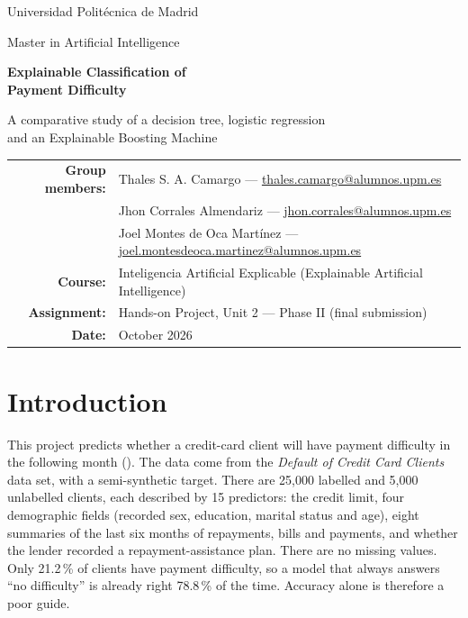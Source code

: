 \documentclass[a4paper,11pt]{article}
\newcommand{\var}[1]{\texttt{\detokenize{#1}}}
\begin{document}
\begin{titlepage}
\centering
\vspace*{1.5cm}
{\Large Universidad Politécnica de Madrid\par}
\vspace{0.4cm}
{\large Master in Artificial Intelligence\par}
\vspace{2cm}
{\huge\bfseries Explainable Classification of\\[0.2em] Payment Difficulty\par}
\vspace{0.8cm}
{\Large A comparative study of a decision tree, logistic regression\\and an Explainable Boosting Machine\par}
\vfill
\small
\begin{tabular}{rl}
\textbf{Group members:} & Thales S. A. Camargo --- \href{mailto:thales.camargo@alumnos.upm.es}{thales.camargo@alumnos.upm.es}\\
 & Jhon Corrales Almendariz --- \href{mailto:jhon.corrales@alumnos.upm.es}{jhon.corrales@alumnos.upm.es}\\
 & Joel Montes de Oca Martínez --- \href{mailto:joel.montesdeoca.martinez@alumnos.upm.es}{joel.montesdeoca.martinez@alumnos.upm.es}\\[0.5cm]
\textbf{Course:} & Inteligencia Artificial Explicable (Explainable Artificial Intelligence)\\
\textbf{Assignment:} & Hands-on Project, Unit 2 --- Phase II (final submission)\\
\textbf{Date:} & October 2026
\end{tabular}
\vfill
\end{titlepage}

\section{Introduction}

This project predicts whether a credit-card client will have payment difficulty in the following month (\var{payment_difficulty_next_month}). The data come from the \emph{Default of Credit Card Clients} data set, with a semi-synthetic target. There are 25{,}000 labelled and 5{,}000 unlabelled clients, each described by 15 predictors: the credit limit, four demographic fields (recorded sex, education, marital status and age), eight summaries of the last six months of repayments, bills and payments, and whether the lender recorded a repayment-assistance plan. There are no missing values. Only 21.2\,\% of clients have payment difficulty, so a model that always answers ``no difficulty'' is already right 78.8\,\% of the time. Accuracy alone is therefore a poor guide.
\end{document}
